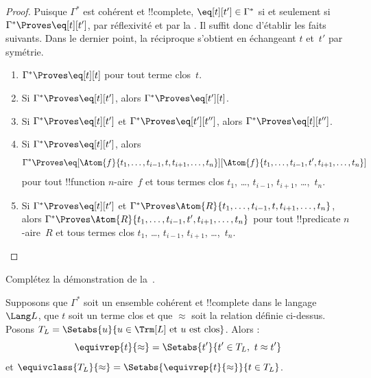 \documentclass[../../../include/open-logic-section]{subfiles}
\begin{document}
\begin{proof}
Puisque $\Gamma^*$ est cohérent et !!{complete},
$\eq[t][t']\in\Gamma^*$ si et seulement si
$\Gamma^*\Proves\eq[t][t']$, par réflexivité et par la
.
Il suffit donc d'établir les faits suivants. Dans le dernier point,
la réciproque s'obtient en échangeant $t$ et~$t'$ par symétrie.
\begin{enumerate}
\item $\Gamma^*\Proves\eq[t][t]$ pour tout terme clos~$t$.
\item Si $\Gamma^*\Proves\eq[t][t']$, alors
  $\Gamma^*\Proves\eq[t'][t]$.
\item Si $\Gamma^*\Proves\eq[t][t']$ et
  $\Gamma^*\Proves\eq[t'][t'']$, alors
  $\Gamma^*\Proves\eq[t][t'']$.
\item Si $\Gamma^*\Proves\eq[t][t']$, alors
\[
\Gamma^*\Proves
\eq[\Atom{f}{t_1,\dots,t_{i-1},t,t_{i+1},\dots,t_n}]
   [\Atom{f}{t_1,\dots,t_{i-1},t',t_{i+1},\dots,t_n}]
\]
pour tout !!{function} $n$-aire~$f$ et tous termes clos $t_1$, \dots,
$t_{i-1}$, $t_{i+1}$, \dots,~$t_n$.
\item Si $\Gamma^*\Proves\eq[t][t']$ et
$\Gamma^*\Proves\Atom{R}{t_1,\dots,t_{i-1},t,t_{i+1},\dots,t_n}$,
alors
$\Gamma^*\Proves\Atom{R}{t_1,\dots,t_{i-1},t',t_{i+1},\dots,t_n}$
pour tout !!{predicate} $n$-aire~$R$ et tous termes clos $t_1$, \dots,
$t_{i-1}$, $t_{i+1}$, \dots,~$t_n$.
\end{enumerate}
\end{proof}

\begin{prob}
Complétez la démonstration de la~.
\end{prob}

\begin{defn}
Supposons que $\Gamma^*$ soit un ensemble cohérent et !!{complete} dans
le langage~$\Lang L$, que $t$ soit un terme clos et que $\approx$ soit
la relation définie ci-dessus. Posons
$T_L=\Setabs{u}{u\in\Trm[L]\text{ et }u\text{ est clos}}$.
Alors :
\[
\equivrep{t}{\approx}=
\Setabs{t'}{t'\in T_L,\ t\approx t'}
\]
et
$\equivclass{T_L}{\approx}=
\Setabs{\equivrep{t}{\approx}}{t\in T_L}$.
\end{defn}
\end{document}
